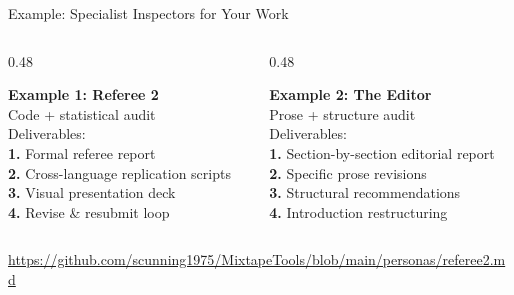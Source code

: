 \documentclass[aspectratio=169, 11pt]{beamer}
\newcommand{\emphgold}[1]{\alert{\textbf{#1}}}
\begin{document}
\begin{frame}{Example: Specialist Inspectors for Your Work}
\vspace{0.08cm}
\begin{columns}[T]
\begin{column}{0.48\textwidth}
  \begin{tcolorbox}[
    enhanced, colback=navy!8, colframe=navy!40, boxrule=0.5pt,
    sharp corners, left=8pt, right=8pt, top=6pt, bottom=6pt,
  ]
    {\normalsize\bfseries\color{navy} Example 1: Referee 2}\\[6pt]
    {\small\color{slate} Code + statistical audit}\\[4pt]
    {\small Deliverables:}\\[2pt]
    {\small \emphgold{1.} Formal referee report}\\
    {\small \emphgold{2.} Cross-language replication scripts}\\
    {\small \emphgold{3.} Visual presentation deck}\\
    {\small \emphgold{4.} Revise \& resubmit loop}
  \end{tcolorbox}
\end{column}
\begin{column}{0.48\textwidth}
  \begin{tcolorbox}[
    enhanced, colback=navy!8, colframe=navy!40, boxrule=0.5pt,
    sharp corners, left=8pt, right=8pt, top=6pt, bottom=6pt,
  ]
    {\normalsize\bfseries\color{navy} Example 2: The Editor}\\[6pt]
    {\small\color{slate} Prose + structure audit}\\[4pt]
    {\small Deliverables:}\\[2pt]
    {\small \emphgold{1.} Section-by-section editorial report}\\
    {\small \emphgold{2.} Specific prose revisions}\\
    {\small \emphgold{3.} Structural recommendations}\\
    {\small \emphgold{4.} Introduction restructuring}
  \end{tcolorbox}
\end{column}
\end{columns}

\vspace{0.15cm}
\small \url{https://github.com/scunning1975/MixtapeTools/blob/main/personas/referee2.md}

\end{frame}
\end{document}
